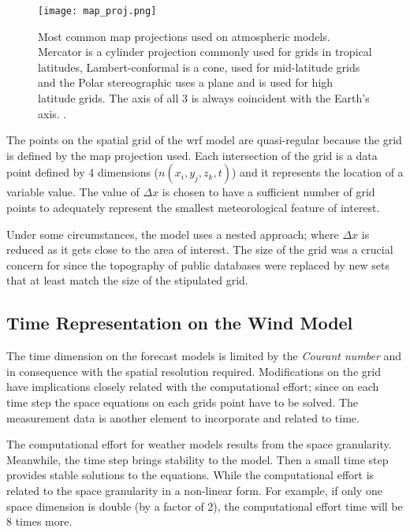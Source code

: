 \begin{figure}
    \centering
    \texttt{[image: map\_proj.png]}
    \caption{Most common map projections used on atmospheric models. Mercator is a cylinder projection commonly used for grids in tropical latitudes, Lambert-conformal is a cone, used for mid-latitude grids and the Polar stereographic uses a plane and is used for high latitude grids. The axis of all 3 is always coincident with the Earth's axis. \cite{warner2010numerical}.}
    \label{fig:map_projection}
\end{figure}

The points on the spatial grid of the \acrshort{wrf} model are quasi-regular because the grid is defined by the map projection used. Each intersection of the grid is a data point defined by 4 dimensions (\textit{$n(x_{i},y_{j},z_{k},t)$}) and it represents the location of a variable value. The value of $\Delta x$ is chosen to have a sufficient number of grid points to adequately represent the smallest meteorological feature of interest. \par

Under some circumstances, the model uses a nested approach; where $\Delta x$ is reduced as it gets close to the area of interest. The size of the grid was a crucial concern for \cite{giannaros2018ultrahigh} since the topography of public databases were replaced by new sets that at least match the size of the stipulated grid.\par

\subsection{Time Representation on the Wind Model}
The time dimension on the forecast models is limited by the \textit{Courant number} and in consequence with the spatial resolution required. Modifications on the grid have implications closely related with the computational effort; since on each time step the space equations on each grids point have to be solved. The measurement data is another element to incorporate and related to time. \par 

The computational effort for weather models results from the space granularity. Meanwhile, the time step brings stability to the model. Then a small time step provides stable solutions to the equations. While the computational effort is related to the space granularity in a non-linear form. For example, if only one space dimension is double (by a factor of 2), the computational effort time will be 8 times more. \par 

